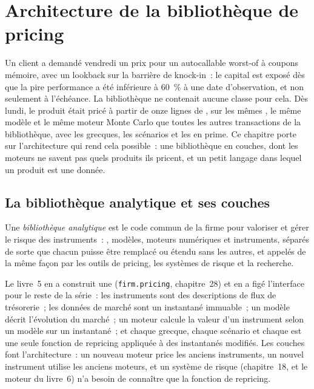 \chapter{Architecture de la bibliothèque de pricing}\label{ch:pl:pricing-library-architecture}

Un client a demandé vendredi un prix pour un autocallable worst-of à coupons mémoire, avec un lookback sur la barrière de knock-in~: le capital est exposé
dès que la pire performance a été inférieure à 60~\% à une date d'observation, et non seulement à l'échéance. La bibliothèque ne contenait aucune classe
pour cela. Dès lundi, le produit était pricé à partir de onze lignes de , sur les mêmes , le même modèle et le même moteur
Monte Carlo que toutes les autres transactions de la bibliothèque, avec les grecques, les scénarios et les  en prime. Ce chapitre porte sur l'architecture qui rend cela possible~: une bibliothèque en couches, dont les moteurs ne savent pas quels produits ils
pricent, et un petit langage dans lequel un produit est une donnée.

\section{La bibliothèque analytique et ses couches}

\begin{definition}\label{def:pl:pricing-library-architecture:library}
Une \emph{bibliothèque analytique} est le code commun de la firme pour valoriser et gérer le risque des instruments~: ,
modèles, moteurs numériques et instruments, séparés de sorte que chacun puisse être remplacé ou étendu sans les autres, et appelés de la même façon par
les outils de pricing, les systèmes de risque et la recherche.
\end{definition}

Le livre~5 en a construit une (\texttt{firm.pricing}, chapitre~28) et en a figé l'interface pour le reste de la série~: les instruments sont des descriptions de
flux de trésorerie~; les données de marché sont un instantané immuable~; un modèle décrit l'évolution du marché~; un moteur calcule la valeur d'un instrument selon
un modèle sur un instantané~; et chaque grecque, chaque scénario et chaque  est une seule fonction de repricing appliquée à des instantanés modifiés. Les couches
font l'architecture~: un nouveau moteur price les anciens instruments, un nouvel instrument utilise les anciens moteurs, et un système de risque (chapitre~18, et le moteur du livre~6)
n'a besoin de connaître que la fonction de repricing.

